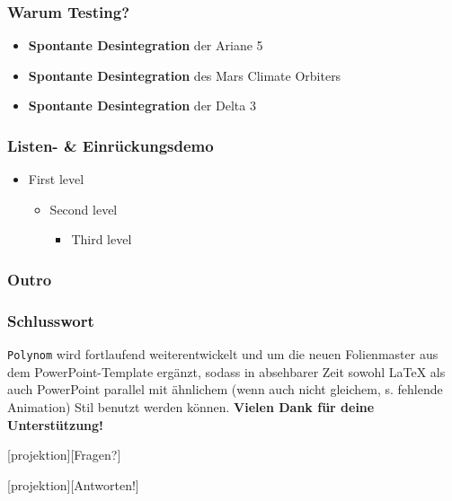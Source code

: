 \documentclass[t]{beamer}
\begin{document}
\begin{frame}
  \frametitle{Warum Testing?}
  \begin{itemize}
    \item \textbf{Spontante Desintegration} der Ariane 5
    \item \textbf{Spontante Desintegration} des Mars Climate Orbiters
    \item \textbf{Spontante Desintegration} der Delta 3
  \end{itemize}
\end{frame}

\begin{frame}
  \frametitle{Listen- \& Einrückungsdemo}
  \begin{itemize}
    \item First level
    \begin{itemize}
      \item Second level
      \begin{itemize}
        \item Third level
      \end{itemize}
    \end{itemize}
  \end{itemize}
\end{frame}

\subsubsection{Outro}

\begin{frame}
  \frametitle{Schlusswort}
  \texttt{Polynom} wird fortlaufend weiterentwickelt und um die neuen Folienmaster aus dem PowerPoint-Template ergänzt, sodass 
  in absehbarer Zeit sowohl \LaTeX{} als auch PowerPoint parallel mit ähnlichem (wenn auch nicht gleichem, s. fehlende Animation) Stil
  benutzt werden können.
  \vskip42pt
  \textbf{Vielen Dank für deine Unterstützung!}
\end{frame}

[projektion][Fragen?]
\begin{frame}
\end{frame}

[projektion][Antworten!]
\begin{frame}
\end{frame}
\end{document}
